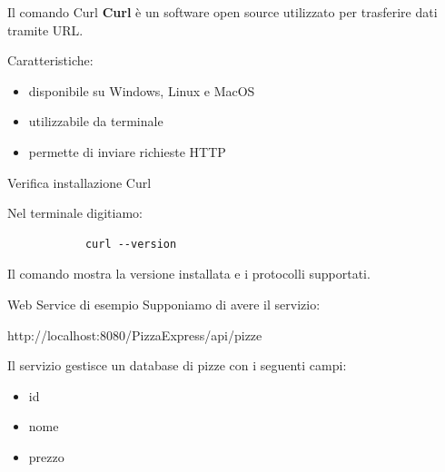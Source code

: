 \documentclass{beamer}
\begin{document}
	
	\begin{frame}{Il comando Curl}
		\textbf{Curl} è un software open source utilizzato per trasferire dati tramite URL.
		
		\bigskip
		
		Caratteristiche:
		
		\begin{itemize}
			\item disponibile su Windows, Linux e MacOS
			\item utilizzabile da terminale
			\item permette di inviare richieste HTTP
		\end{itemize}
		
	\end{frame}
	
	
	\begin{frame}[fragile]{Verifica installazione Curl}
		
		Nel terminale digitiamo:
		
		\begin{lstlisting}
			curl --version
		\end{lstlisting}
		
		Il comando mostra la versione installata e i protocolli supportati.
		
	\end{frame}
	
	
	\begin{frame}{Web Service di esempio}
		Supponiamo di avere il servizio:
		
		\begin{center}
			http://localhost:8080/PizzaExpress/api/pizze
		\end{center}
		
		Il servizio gestisce un database di pizze con i seguenti campi:
		
		\begin{itemize}
			\item id
			\item nome
			\item prezzo
		\end{itemize}
		
	\end{frame}
	
	
\end{document}
